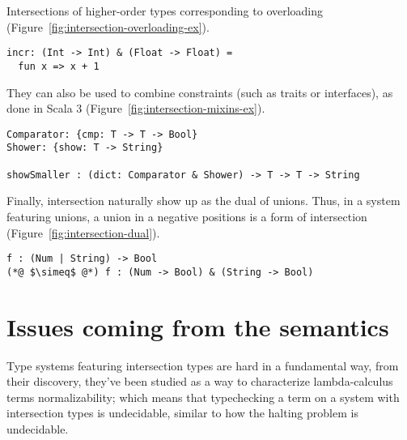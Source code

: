 \documentclass[sigplan,10pt,review,anonymous]{acmart}
\newcommand{\info}[2][1=]{}
\begin{document}
Intersections of higher-order types corresponding to overloading
(Figure~\ref{fig:intersection-overloading-ex}).

\label{fig:intersection-overloading-ex}
\begin{lstlisting}[title={Overloading}]
incr: (Int -> Int) & (Float -> Float) =
  fun x => x + 1
\end{lstlisting}

They can also be used to combine constraints (such as traits or interfaces), as
done in Scala 3 (Figure~\ref{fig:intersection-mixins-ex}).

\label{fig:intersection-mixins-ex}
\begin{lstlisting}[title={Structural mixins}]
Comparator: {cmp: T -> T -> Bool}
Shower: {show: T -> String}

showSmaller : (dict: Comparator & Shower) -> T -> T -> String
\end{lstlisting}

Finally, intersection naturally show up as the dual of unions. Thus, in a system
featuring unions, a union in a negative positions is a form of intersection
(Figure~\ref{fig:intersection-dual}).

\label{fig:intersection-dual}
\begin{lstlisting}[title={Intersection as the dual of unions}]
f : (Num | String) -> Bool
(*@ $\simeq$ @*) f : (Num -> Bool) & (String -> Bool)
\end{lstlisting}


\newpage

\section{Issues coming from the semantics}
\info{What goes wrong or difficult when trying to implement union and
  intersection literally}

Type systems featuring intersection types are hard in a fundamental way,
from their discovery, they've been studied as a way to characterize
lambda-calculus terms normalizability; which means that typechecking a
term on a system with intersection types is undecidable,
similar to how the halting problem is undecidable.
\end{document}
